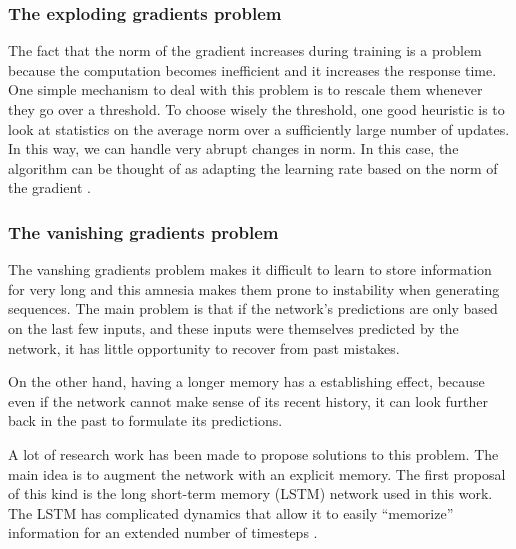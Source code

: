 
\subsubsection*{The exploding gradients problem}
 The fact that the norm of the gradient increases during training is a problem because the computation becomes inefficient and it increases the response time. One simple mechanism to deal with this problem is to rescale them whenever they go over a threshold. To choose wisely the threshold, one good heuristic is to look at statistics on the average norm over a sufficiently large number of updates. In this way, we can handle very abrupt changes in norm. In this case, the algorithm can be thought of as adapting the learning rate based on the norm of the gradient  \cite{pascanu2013difficulty}.

\subsubsection*{The vanishing gradients problem}

The vanshing gradients problem makes it difficult to learn to store information for very long and this amnesia makes them prone to instability when generating sequences. The main problem is that if the network's predictions  are only based on the last few inputs, and these inputs were themselves predicted by the network, it has little opportunity to recover from past mistakes.

On the other hand, having a longer memory has a establishing effect, because even if the network cannot make sense of its recent history, it can look further back in the past to formulate its predictions. \cite{graves2013generating}

A lot of research work has been made to propose solutions to this problem. The main idea is to augment the network with an explicit memory. The first proposal of this kind is the long short-term memory (LSTM) network used in this work. The LSTM has complicated dynamics that allow it to easily “memorize” information for an extended number of timesteps \cite{zaremba2014recurrent}.


